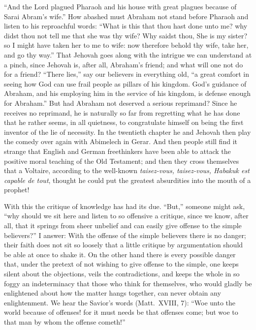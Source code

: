 \documentclass[12pt]{book}
\newcommand{\opage}[1]{\marginnote{\footnotesize\textit{[#1]}}}
\begin{document}
``And the Lord plagued Pharaoh and his house with great plagues because of
Sarai Abram's wife.'' How abashed must Abraham not stand before Pharaoh
\opage{182}\setcounter{footnote}{0}%
and listen to his reproachful words: ``What is this that thou hast done
unto me? why didst thou not tell me that she was thy wife? Why saidst
thou, She is my sister? so I might have taken her to me to wife: now
therefore behold thy wife, take her, and go thy way.'' That Jehovah goes
along with the intrigue we can understand at a pinch, since Jehovah is,
after all, Abraham's friend; and what will one not do for a friend? ``There
lies,'' say our believers in everything old, ``a great comfort in seeing
how God can use frail people as pillars of his kingdom. God's guidance of
Abraham, and his employing him in the service of his kingdom, is defense
enough for Abraham.'' But had Abraham not deserved a serious reprimand?
Since he receives no reprimand, he is naturally so far from regretting
what he has done that he rather seems, in all quietness, to congratulate
himself on being the first inventor of the lie of necessity. In the
twentieth chapter he and Jehovah then play the comedy over again with
Abimelech in Gerar. And then people still find it strange that English and
German freethinkers have been able to attack the positive moral teaching
of the Old Testament; and then they cross themselves that a Voltaire,
according to the well-known \textit{taisez-vous, taisez-vous, Habakuk est
capable de tout}, thought he could put the greatest absurdities into the
mouth of a prophet!

With this the critique of knowledge has had its due. ``But,'' someone
might ask, ``why should we sit here and listen to so offensive a critique,
since we know, after all, that it springs from sheer unbelief and can
easily give offense to the simple believers?'' I answer: With the offense
of the simple believers there is no danger; their faith does not sit so
loosely that a little critique by argumentation should be able at once to
shake it. On the other hand there is every possible danger that, under the
pretext of not wishing to give offense to the simple, one keeps silent
about the
\opage{183}\setcounter{footnote}{0}%
objections, veils the contradictions, and keeps the whole in so foggy an
indeterminacy that those who think for themselves, who would gladly be
enlightened about how the matter hangs together, can never obtain any
enlightenment. We hear the Savior's words (Matt.\ XVIII, 7): ``Woe unto
the world because of offenses! for it must needs be that offenses come;
but woe to that man by whom the offense cometh!''
\end{document}
